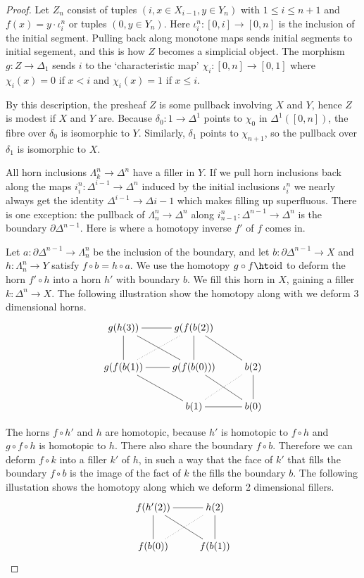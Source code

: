 \documentclass{amsart}
\theoremstyle{plain}
\theoremstyle{definition}
\newcommand\id{\mathrm{id}}
\begin{document}
\begin{proof}
Let $Z_n$ consist of tuples $(i, x\in X_{i-1}, y\in Y_n)$ with $1\leq i\leq n+1$ and $f(x) = y\cdot \iota^n_i$ or tuples $(0,y\in Y_n)$. Here $\iota^n_i:[0,i] \to [0,n]$ is the inclusion of the initial segment. Pulling back along monotone maps sends initial segments to initial segement, and this is how $Z$ becomes a simplicial object. The morphism $g:Z \to \Delta_1$ sends $i$ to the `characteristic map' $\chi_i:[0,n]\to[0,1]$ where $\chi_i(x) = 0$ if $x<i$ and $\chi_i(x) = 1$ if $x\leq i$.

By this description, the presheaf $Z$ is some pullback involving $X$ and $Y$, hence $Z$ is modest if $X$ and $Y$ are. Because $\delta_0: 1 \to \Delta^1$ points to $\chi_0$ in $\Delta^1([0,n])$, the fibre over $\delta_0$ is isomorphic to $Y$. Similarly, $\delta_1$ points to $\chi_{n+1}$, so the pullback over $\delta_1$ is isomorphic to $X$.

All horn inclusions $\Lambda^n_k \to \Delta^n$ have a filler in $Y$. If we pull horn inclusions back along the maps $i^n_i:\Delta^{i-1} \to \Delta^n$ induced by the initial inclusions $\iota^n_i$ we nearly always get the identity $\Delta^{i-1}\to\Delta{i-1}$ which makes filling up superfluous. There is one exception: the pullback of $\Lambda^n_n \to\Delta^n$ along $i^n_{n-1}:\Delta^{n-1}\to\Delta^n$ is the boundary $\partial\Delta^{n-1}$. Here is where a homotopy inverse $f'$ of $f$ comes in.

Let $a:\partial\Delta^{n-1} \to \Lambda_n^n$ be the inclusion of the boundary, and let $b:\partial\Delta^{n-1}\to X$ and $h:\Lambda^n_n \to Y$ satisfy $f\circ b = h\circ a$. We use the homotopy $g\circ f \hto \id$ to deform the horn $f'\circ h$ into a horn $h'$ with boundary $b$. We fill this horn in $X$, gaining a filler $k:\Delta^n \to X$. The following illustration show the homotopy along with we deform 3 dimensional horns.
\[ \xymatrix{
g(h(3)) \ar@{-}[r]\ar@{-}[dr]\ar@{-}[d] & g(f(b(2)) \ar@{-}[dr]\ar@{-}[d] \\
g(f(b(1))\ar@{-}[dr]\ar@{.}[ur]\ar@{-}[r] & g(f(b(0))) \ar@{-}[dr] & b(2)\ar@{-}[d]\\
& b(1) \ar@{-}[r]\ar@{.}[ur] & b(0)
} \]

The horns $f\circ h'$ and $h$ are homotopic, because $h'$ is homotopic to $f\circ h$ and $g\circ f \circ h$ is homotopic to $h$. There also share the boundary $f\circ b$. Therefore we can deform $f\circ k$ into a filler $k'$ of $h$, in such a way that the face of $k'$ that fills the boundary $f\circ b$ is the image of the fact of $k$ the fills the boundary $b$. The following illustation shows the homotopy along which we deform 2 dimensional fillers.
\[ \xymatrix{
f(h'(2)) \ar@{-}[r]\ar@{-}[dr]\ar@{-}[d] & h(2)\ar@{-}[d] \\
f(b(0))\ar@{.}[ur] & f(b(1))
}\]
\end{proof}
\end{document}
